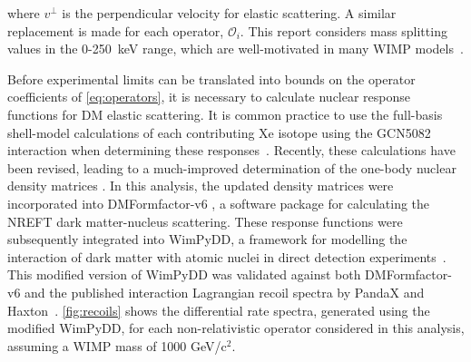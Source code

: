 \documentclass[reprint, showpacs,
preprintnumbers,
amsmath,amssymb,
aps, floatfix,
superscriptaddress,
prd, nofootinbib]{revtex4-1}
\begin{document}
where $v^\perp$ is the perpendicular velocity for elastic scattering. 
A similar replacement is made for each operator, $\mathcal{O}_i$. 
This report considers mass splitting values in the 0-250~keV range, which are well-motivated in many WIMP models~\cite{Smith_2001, Barello_2014}.
\par
Before experimental limits can be translated into bounds on the operator coefficients of \autoref{eq:operators}, it is necessary to calculate nuclear response functions for DM elastic scattering. 
It is common practice to use the full-basis shell-model calculations of each contributing Xe isotope using the GCN5082 interaction when determining these responses~\cite{MENENDEZ2009139}. 
Recently, these calculations have been revised, leading to a much-improved determination of the one-body nuclear density matrices \cite{haxton_unpublished}.
In this analysis, the updated density matrices were incorporated into DMFormfactor-v6 \cite{Anand:MathematicaEFT}, a software package for calculating the NREFT dark matter-nucleus scattering. 
These response functions were subsequently integrated into WimPyDD, a framework for modelling the interaction of dark matter with atomic nuclei in direct detection experiments~\cite{Jeong_2022}. 
This modified version of WimPyDD was validated against both DMFormfactor-v6 and the published interaction Lagrangian recoil spectra by PandaX and Haxton~\cite{PandaX2:SD_EFT_2019}.
\autoref{fig:recoils} shows the differential rate spectra, generated using the modified WimPyDD, for each non-relativistic operator considered in this analysis, assuming a WIMP mass of 1000 GeV/c$^2$.
\end{document}
